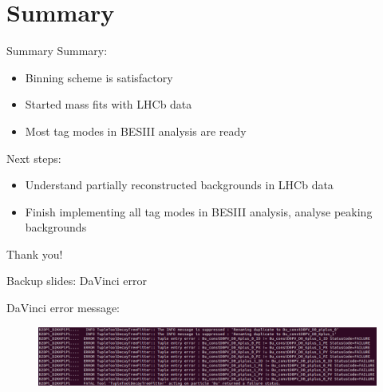 \documentclass{beamer}
\begin{document}
\section{Summary}
\begin{frame}{Summary}
  Summary:
  \begin{itemize}
    \item{Binning scheme is satisfactory}
    \item{Started mass fits with LHCb data}
    \item{Most tag modes in BESIII analysis are ready}
  \end{itemize}
  Next steps:
  \begin{itemize}
    \item{Understand partially reconstructed backgrounds in LHCb data}
    \item{Finish implementing all tag modes in BESIII analysis, analyse peaking backgrounds}
  \end{itemize}
  \begin{center}
    Thank you!
  \end{center}
\end{frame}

\begin{frame}{Backup slides: DaVinci error}
  \begin{center}
    DaVinci error message:
  \end{center}
  \begin{figure}
    \includegraphics[width = 1\textwidth]{DaVinciError.png}
  \end{figure}
\end{frame}
\end{document}
